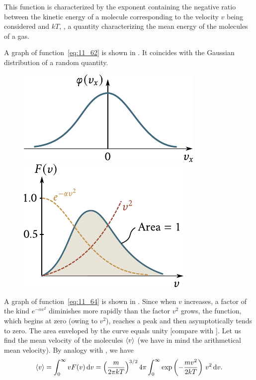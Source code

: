 \noindent
This function is characterized by the exponent containing the negative ratio between the kinetic energy of a molecule corresponding to the velocity $v$ being considered and $kT$, \ie, a quantity characterizing the mean energy of the molecules of a gas.

A graph of function~\eqref{eq:11_62} is shown in . It coincides with the Gaussian distribution of a random quantity.

\begin{figure}[t]
	\begin{minipage}[t]{0.5\linewidth}
		\begin{center}
			\includegraphics[scale=0.95]{figures/ch_11/fig_11_16.pdf}
			\caption[]{}
			\label{fig:11_16}
		\end{center}
	\end{minipage}
	\hspace{-0.05cm}
	\begin{minipage}[t]{0.5\linewidth}
		\begin{center}
			\includegraphics[scale=0.95]{figures/ch_11/fig_11_17.pdf}
			\caption[]{}
			\label{fig:11_17}
		\end{center}
	\end{minipage}
	\vspace{-0.7cm}
\end{figure}

A graph of function~\eqref{eq:11_64} is shown in . Since when $v$ increases, a factor of the kind $e^{-\alpha v^2}$ diminishes more rapidly than the factor $v^2$ grows, the function, which begins at zero (owing to $v^2$), reaches a peak and then asymptotically tends to zero. The area enveloped by the curve equals unity [compare with ]. Let us find the mean velocity of the molecules $\left\langle v \right\rangle$ (we have in mind the arithmetical mean velocity). By analogy with , we have
\begin{equation*}
	\left\langle v \right\rangle = \int_{0}^{\infty} vF(v)\,\mathrm{d} v = \left(\frac{m}{2\pi kT}\right)^{3/2} 4\pi \int_{0}^{\infty} \exp\left(-\frac{mv^2}{2kT}\right)\,v^2\,\mathrm{d} v.
\end{equation*}

